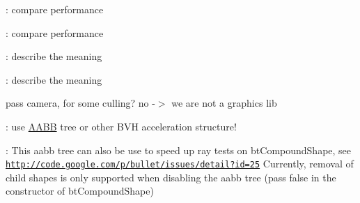 
\begin{DoxyRefList}
\item[\label{todo__todo000007}%
\Hypertarget{todo__todo000007}%
Member \hyperlink{classbtAxisSweep3Internal_a4e26f4f8acf63f26451f6396223001bb}{bt\+Axis\+Sweep3\+Internal$<$ B\+P\+\_\+\+F\+P\+\_\+\+I\+N\+T\+\_\+\+T\+Y\+PE $>$\+:\+:remove\+Handle} (B\+P\+\_\+\+F\+P\+\_\+\+I\+N\+T\+\_\+\+T\+Y\+PE handle, \hyperlink{classbtDispatcher}{bt\+Dispatcher} $\ast$dispatcher)]\+: compare performance 

\+: compare performance  
\item[\label{todo__todo000009}%
\Hypertarget{todo__todo000009}%
Class \hyperlink{classbtCollisionConfiguration}{bt\+Collision\+Configuration} ]\+: describe the meaning 

\+: describe the meaning  
\item[\label{todo__todo000011}%
\Hypertarget{todo__todo000011}%
Member \hyperlink{classbtCollisionWorld_ac1ca6489c220005798069152c3df0d08}{bt\+Collision\+World\+:\+:debug\+Draw\+Object} (const bt\+Transform \&world\+Transform, const bt\+Collision\+Shape $\ast$shape, const bt\+Vector3 \&color)]pass camera, for some culling? no -\/$>$ we are not a graphics lib  
\item[\label{todo__todo000010}%
\Hypertarget{todo__todo000010}%
Member \hyperlink{classbtCollisionWorld_a2312e2da71f0d7646a4dc19a4966bed0}{bt\+Collision\+World\+:\+:object\+Query\+Single\+Internal} (const bt\+Convex\+Shape $\ast$cast\+Shape, const bt\+Transform \&convex\+From\+Trans, const bt\+Transform \&convex\+To\+Trans, const \hyperlink{structbtCollisionObjectWrapper}{bt\+Collision\+Object\+Wrapper} $\ast$col\+Obj\+Wrap, \hyperlink{structbtCollisionWorld_1_1ConvexResultCallback}{Convex\+Result\+Callback} \&result\+Callback, bt\+Scalar allowed\+Penetration)]\+: use \hyperlink{classAABB}{A\+A\+BB} tree or other B\+VH acceleration structure!  
\item[\label{todo__todo000021}%
\Hypertarget{todo__todo000021}%
Class \hyperlink{structbtCompoundShapeChildData}{bt\+Compound\+Shape\+Child\+Data} ]\+: This aabb tree can also be use to speed up ray tests on bt\+Compound\+Shape, see \href{http://code.google.com/p/bullet/issues/detail?id=25}{\tt http\+://code.\+google.\+com/p/bullet/issues/detail?id=25} Currently, removal of child shapes is only supported when disabling the aabb tree (pass \textquotesingle{}false\textquotesingle{} in the constructor of bt\+Compound\+Shape) 


\end{DoxyRefList}
